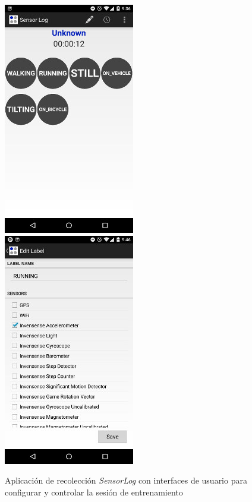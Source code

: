 \begin{figure}[!tbph]
\begin{centering}
\includegraphics[scale=0.8]{capitulo-4/graphics/sensorlog1}\includegraphics[scale=0.8]{capitulo-4/graphics/sensorlog2}
\par\end{centering}
\caption[Aplicación de recolección \emph{SensorLog}]{\label{fig4:sensor-log}Aplicación de recolección \emph{SensorLog
}con interfaces de usuario para configurar y controlar la sesión de
entrenamiento}
\end{figure}

